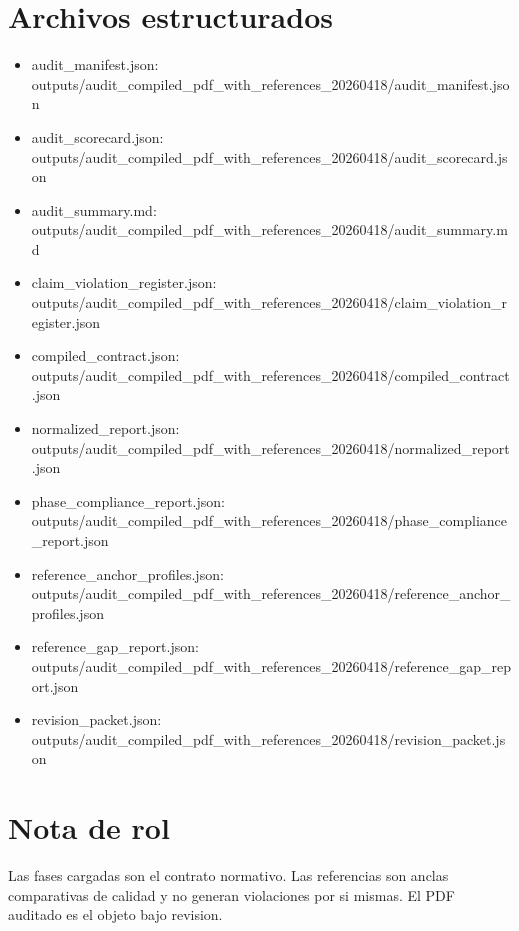 \documentclass[11pt]{article}
\begin{document}
\section*{Archivos estructurados}
\begin{itemize}
\item audit\_manifest.json: outputs/audit\_compiled\_pdf\_with\_references\_20260418/audit\_manifest.json
\item audit\_scorecard.json: outputs/audit\_compiled\_pdf\_with\_references\_20260418/audit\_scorecard.json
\item audit\_summary.md: outputs/audit\_compiled\_pdf\_with\_references\_20260418/audit\_summary.md
\item claim\_violation\_register.json: outputs/audit\_compiled\_pdf\_with\_references\_20260418/claim\_violation\_register.json
\item compiled\_contract.json: outputs/audit\_compiled\_pdf\_with\_references\_20260418/compiled\_contract.json
\item normalized\_report.json: outputs/audit\_compiled\_pdf\_with\_references\_20260418/normalized\_report.json
\item phase\_compliance\_report.json: outputs/audit\_compiled\_pdf\_with\_references\_20260418/phase\_compliance\_report.json
\item reference\_anchor\_profiles.json: outputs/audit\_compiled\_pdf\_with\_references\_20260418/reference\_anchor\_profiles.json
\item reference\_gap\_report.json: outputs/audit\_compiled\_pdf\_with\_references\_20260418/reference\_gap\_report.json
\item revision\_packet.json: outputs/audit\_compiled\_pdf\_with\_references\_20260418/revision\_packet.json
\end{itemize}
\section*{Nota de rol}
Las fases cargadas son el contrato normativo. Las referencias son anclas comparativas de calidad y no generan violaciones por si mismas. El PDF auditado es el objeto bajo revision.
\end{document}
